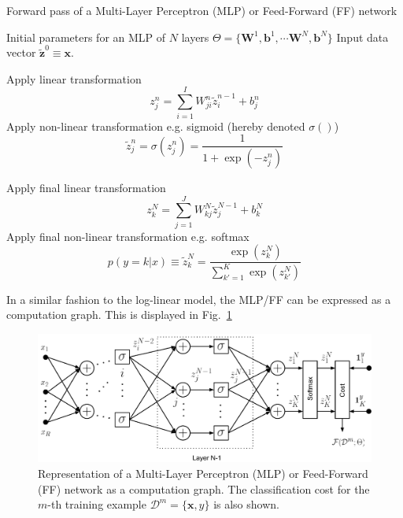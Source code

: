 \begin{algorithm}[th!]
\label{algo:mlpforward}
   \caption{Forward pass of a Multi-Layer Perceptron (MLP) or Feed-Forward (FF) network\label{alg:mlpforward}}
\begin{algorithmic}[1]

    Initial parameters for an MLP of $N$ layers $\Theta=\{\mathbf{W}^1, \mathbf{b}^1, \cdots \mathbf{W}^N, \mathbf{b}^N\}$
    Input data vector $\mathbf{\tilde{z}}^{0}  \equiv \mathbf{x}$. 

     \STATE Apply  linear transformation 
        $$z_j^n = \sum_{i=1}^{I} W_{ji}^n \tilde{z}_i^{n-1} + b_j^n$$
     \STATE Apply non-linear transformation e.g. sigmoid (hereby denoted $\sigma()$)
     $$\tilde{z}_j^n = \sigma(z_j^n)  = \frac{1}{1+\exp(-z_j^n)}$$

	\ENDFOR

\STATE Apply final linear transformation 
   $$z_k^N = \sum_{j=1}^{J} W_{kj}^N \tilde{z}_j^{N-1} + b_k^N$$
\STATE Apply final non-linear transformation e.g. softmax 
$$p(y=k|{x}) \equiv \tilde{z}_k^N = \frac{\exp(z_k^N)}{\sum_{k'=1}^{K} \exp(z_{k'}^N)}$$

\end{algorithmic}
\end{algorithm}

\noindent In a similar fashion to the log-linear model, the MLP/FF can be expressed as a computation graph. This is displayed in Fig.~\ref{fig:FF}

\begin{figure}[!hb]
\centering
\includegraphics[scale=0.6]{figs/deep_learning/NN.pdf}
\caption{Representation of a Multi-Layer Perceptron (MLP) or Feed-Forward (FF) network as a computation graph. The classification cost
for the $m$-th training example $\mathcal{D}^m=\{\mathbf{x}, y\}$ is also
shown.}
\label{fig:FF}
\end{figure}

